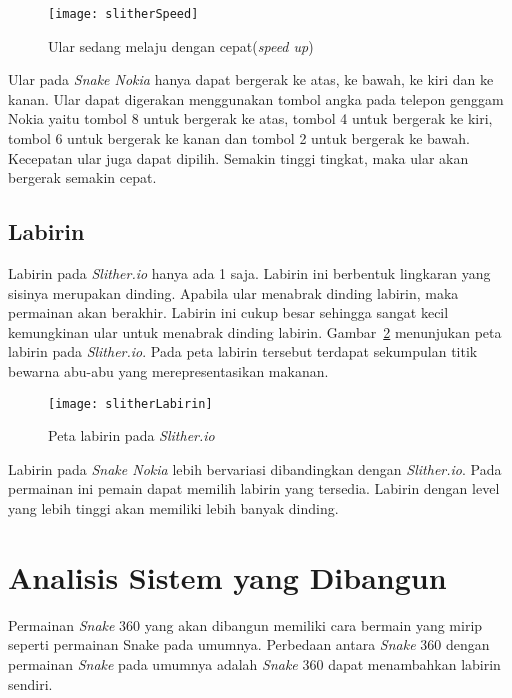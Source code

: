 \begin{figure}[H]
	\centering  
	\texttt{[image: slitherSpeed]}  
	\caption[Ular sedang melaju dengan cepat(\textit{speed up})]{Ular sedang melaju dengan cepat(\textit{speed up})}
	\label{fig:slitherSpeed} 
\end{figure}

Ular pada \textit{Snake Nokia} hanya dapat bergerak ke atas, ke bawah, ke kiri dan ke kanan. Ular dapat digerakan menggunakan tombol angka pada telepon genggam Nokia yaitu tombol 8 untuk bergerak ke atas, tombol 4 untuk bergerak ke kiri, tombol 6 untuk bergerak ke kanan dan tombol 2 untuk bergerak ke bawah. Kecepatan ular juga dapat dipilih. Semakin tinggi tingkat, maka ular akan bergerak semakin cepat.

\subsection{Labirin}
Labirin pada \textit{Slither.io} hanya ada 1 saja. Labirin ini berbentuk lingkaran yang sisinya merupakan dinding. Apabila ular menabrak dinding labirin, maka permainan akan berakhir. Labirin ini cukup besar sehingga sangat kecil kemungkinan ular untuk menabrak dinding labirin. Gambar~\ref{fig:slitherLabirin} menunjukan peta labirin pada \textit{Slither.io}. Pada peta labirin tersebut terdapat sekumpulan titik bewarna abu-abu yang merepresentasikan makanan.

\begin{figure}[H]
	\centering  
	\texttt{[image: slitherLabirin]}  
	\caption[Peta labirin pada \textit{Slither.io}]{Peta labirin pada \textit{Slither.io}}
	\label{fig:slitherLabirin} 
\end{figure}

Labirin pada \textit{Snake Nokia} lebih bervariasi dibandingkan dengan \textit{Slither.io}. Pada permainan ini pemain dapat memilih labirin yang tersedia. Labirin dengan level yang lebih tinggi akan memiliki lebih banyak dinding. 

\section{Analisis Sistem yang Dibangun}
Permainan \textit{Snake} 360 yang akan dibangun memiliki cara bermain yang mirip seperti permainan Snake pada umumnya. Perbedaan antara \textit{Snake} 360 dengan permainan \textit{Snake} pada umumnya adalah \textit{Snake} 360 dapat menambahkan labirin sendiri. 

